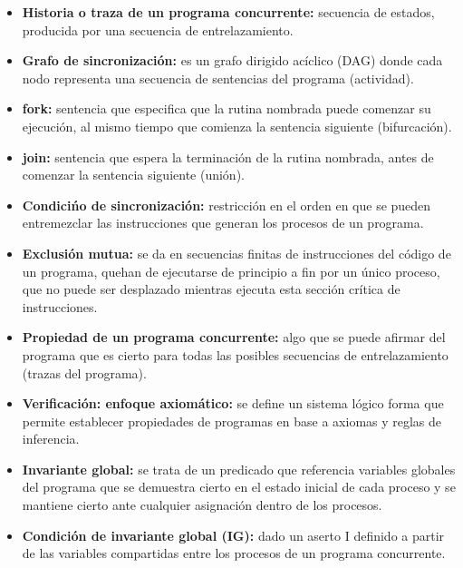 \documentclass[a4paper,11pt]{article}
\begin{document}
\begin{itemize}
\item \textbf{Historia o traza de un programa concurrente:} secuencia de estados, producida por una secuencia de entrelazamiento.

\item \textbf{Grafo de sincronización:} es un grafo dirigido acíclico (DAG) donde cada nodo representa una secuencia de sentencias del programa (actividad).

\item \textbf{fork:} sentencia que especifica que la rutina nombrada puede comenzar su ejecución, al mismo tiempo que comienza la sentencia siguiente (bifurcación).

\item \textbf{join:} sentencia que espera la terminación de la rutina nombrada, antes de comenzar la sentencia siguiente (unión).

\item \textbf{Condicińo de sincronización:} restricción en el orden en que se pueden entremezclar las instrucciones que generan los procesos de un programa.

\item \textbf{Exclusión mutua:} se da en secuencias finitas de instrucciones del código de un programa, quehan de ejecutarse de principio a fin por un único proceso, que no puede ser desplazado mientras ejecuta esta sección crítica de instrucciones.

\item \textbf{Propiedad de un programa concurrente:} algo que se puede afirmar del programa que es cierto para todas las posibles secuencias de entrelazamiento (trazas del programa).

\item \textbf{Verificación: enfoque axiomático:} se define un sistema lógico forma que permite establecer propiedades de programas en base a axiomas y reglas de inferencia.

\item \textbf{Invariante global:} se trata de un predicado que referencia variables globales del programa que se demuestra cierto en el estado inicial de cada proceso y se mantiene cierto ante cualquier asignación dentro de los procesos.

\item \textbf{Condición de invariante global (IG):} dado un aserto I definido a partir de las variables compartidas entre los procesos de un programa concurrente.
\end{itemize}
\end{document}
